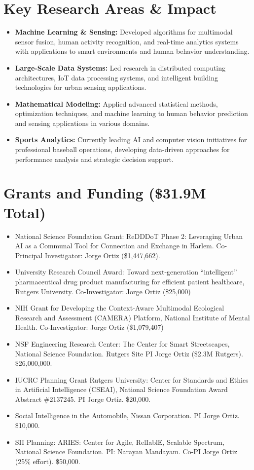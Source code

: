 \documentclass[12pt]{article}
\begin{document}
\section{Key Research Areas \& Impact}
\begin{itemize}
    \item \textbf{Machine Learning \& Sensing:} Developed algorithms for multimodal sensor fusion, human activity recognition, and real-time analytics systems with applications to smart environments and human behavior understanding.
    \item \textbf{Large-Scale Data Systems:} Led research in distributed computing architectures, IoT data processing systems, and intelligent building technologies for urban sensing applications.
    \item \textbf{Mathematical Modeling:} Applied advanced statistical methods, optimization techniques, and machine learning to human behavior prediction and sensing applications in various domains.
    \item \textbf{Sports Analytics:} Currently leading AI and computer vision initiatives for professional baseball operations, developing data-driven approaches for performance analysis and strategic decision support.
\end{itemize}

\section{Grants and Funding (\$31.9M Total)}
\begin{itemize}
    \item National Science Foundation Grant: ReDDDoT Phase 2: Leveraging Urban AI as a Communal Tool for Connection and Exchange in Harlem. Co-Principal Investigator: Jorge Ortiz (\$1,447,662).
    \item University Research Council Award: Toward next-generation ``intelligent'' pharmaceutical drug product manufacturing for efficient patient healthcare, Rutgers University. Co-Investigator: Jorge Ortiz (\$25,000)
    \item NIH Grant for Developing the Context-Aware Multimodal Ecological Research and Assessment (CAMERA) Platform, National Institute of Mental Health. Co-Investigator: Jorge Ortiz (\$1,079,407)
    \item NSF Engineering Research Center: The Center for Smart Streetscapes, National Science Foundation. Rutgers Site PI Jorge Ortiz (\$2.3M Rutgers). \$26,000,000.
    \item IUCRC Planning Grant Rutgers University: Center for Standards and Ethics in Artificial Intelligence (CSEAI), National Science Foundation Award Abstract \#2137245. PI Jorge Ortiz. \$20,000.
    \item Social Intelligence in the Automobile, Nissan Corporation. PI Jorge Ortiz. \$10,000.
    \item SII Planning: ARIES: Center for Agile, RelIablE, Scalable Spectrum, National Science Foundation. PI: Narayan Mandayam. Co-PI Jorge Ortiz (25\% effort). \$50,000.
\end{itemize}
\end{document}
